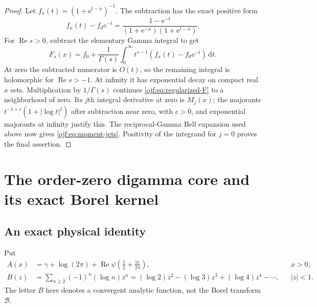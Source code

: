 \documentclass[11pt,a4paper]{article}
\numberwithin{equation}{section}
\theoremstyle{definition}\newtheorem{definition}[theorem]{Definition}
\theoremstyle{remark}\newtheorem{remark}[theorem]{Remark}
\newcommand{\ee}{\mathrm e}\newcommand{\ii}{\mathrm i}\newcommand{\dd}{\,\mathrm d}
\newcommand{\Rea}{\operatorname{Re}}\newcommand{\Ima}{\operatorname{Im}}
\newcommand{\B}{\mathcal B}\newcommand{\calF}{\mathcal F}\newcommand{\calL}{\mathcal L}
\begin{document}
\begin{proof}
Let $f_x(t)=(1+\ee^{t-x})^{-1}$. The subtraction has the exact
positive form
\begin{equation}\label{ojf:eq:positive-subtraction}
 f_x(t)-f_0\ee^{-t}
  =\frac{1-\ee^{-t}}{(1+\ee^{-x})(1+\ee^{t-x})}.
\end{equation}
For $\Rea s>0$, subtract the elementary Gamma integral to get
\begin{equation}\label{ojf:eq:regularized-F}
 F_s(x)=f_0+\frac1{\Gamma(s)}\int_0^\infty
                          t^{s-1}(f_x(t)-f_0\ee^{-t})\dd t.
\end{equation}
At zero the subtracted numerator is $O(t)$, so the remaining integral
is holomorphic for $\Rea s>-1$. At infinity it has exponential decay
on compact real $x$ sets. Multiplication by $1/\Gamma(s)$ continues
\eqref{ojf:eq:regularized-F} to a neighborhood of zero.
Its $j$th integral derivative at zero is $M_j(x)$; the majorants
$t^{-1+\epsilon}(1+|\log t|^j)$ after subtraction near zero, with
$\epsilon>0$, and exponential majorants at infinity justify this.
The reciprocal-Gamma Bell expansion used above now gives
\eqref{ojf:eq:moment-jets}. Positivity of the integrand for $j=0$ proves
the final assertion.
\end{proof}

\section{The order-zero digamma core and its exact Borel kernel}
\label{ojf:sec:borelzero}

\subsection{An exact physical identity}
Put
\begin{align}
 A(x)&=\gamma+\log(2\pi)+
              \Rea\psi\left(\tfrac12+\frac{\ii x}{2\pi}\right),
                   &&x>0,\label{ojf:eq:A-real}\\
 B(z)&=\sum_{n\ge2}(-1)^n(\log n)z^n
          =(\log2)z^2-(\log3)z^3+(\log4)z^4-\cdots,
                   &&|z|<1.\label{ojf:eq:B}
\end{align}
The letter $B$ here denotes a convergent analytic function, not the
Borel transform $\B$.
\end{document}
